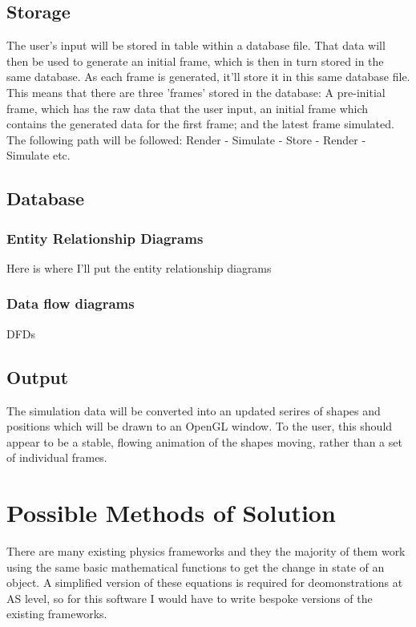 \subsection{Storage}
	The user's input will be stored in table within a database file. That data will then be used to generate an initial frame, which is then in turn stored in the same database. As each frame is generated, it'll store it in this same database file. This means that there are three 'frames' stored in the database: A pre-initial frame, which has the raw data that the user input, an initial frame which contains the generated data for the first frame; and the latest frame simulated. The following path will be followed: Render - Simulate - Store - Render - Simulate etc.

\subsection{Database}

\subsubsection{Entity Relationship Diagrams}
	Here is where I'll put the entity relationship diagrams

\subsubsection{Data flow diagrams}
	DFDs


\subsection{Output}
	The simulation data will be  converted into an updated serires of shapes and positions which will be drawn to an OpenGL window. To the user, this should appear to be a stable, flowing animation of the shapes moving, rather than a set of individual frames.

\section{Possible Methods of Solution}
	There are many existing physics frameworks and they the majority of them work using the same basic mathematical functions to get the change in state of an object. A simplified version of these equations is required for deomonstrations at AS level, so for this software I would have to write bespoke versions of the existing frameworks.

